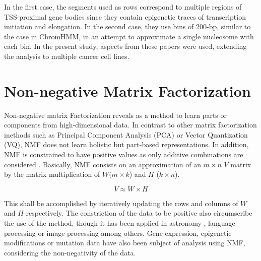 \medskip

In the first case, the segments used as rows correspond to multiple regions of TSS-proximal gene bodies since they contain epigenetic traces of transcription initiation and elongation. In the second case, they use bins of 200-bp, similar to the case in ChromHMM, in an attempt to approximate a single nucleosome with each bin. In the present study, aspects from these papers were used, extending the analysis to multiple cancer cell lines.


\section{Non-negative Matrix Factorization}

Non-negative matrix Factorization reveals as a method to learn parts or components from high-dimensional data. In contrast to other matrix factorization methods such as Principal Component Analysis (PCA) or Vector Quantization (VQ), NMF does not learn holistic but part-based representations. In addition, NMF is constrained to have positive values as only additive combinations are considered \cite{Lee1999}. Basically, NMF consists on an approximation of an \(m \times n\) \(V\) matrix by the matrix multiplication of \(W\)(\(m \times k\)) and \(H\) (\(k \times n\)).

\begin{equation}
    V \approx W \times H
\end{equation}

This shall be accomplished by iteratively updating the rows and columns of \(W\) and \(H\) respectively. The constriction of the data to be positive also circumscribe the use of the method, though it has been applied in astronomy \cite{Ren2017}, language processing \cite{Bertin2010} or image processing \cite{Yang2007} among others. Gene expression, epigenetic modifications or mutation data have also been subject of analysis using NMF, considering the non-negativity of the data.

\medskip

